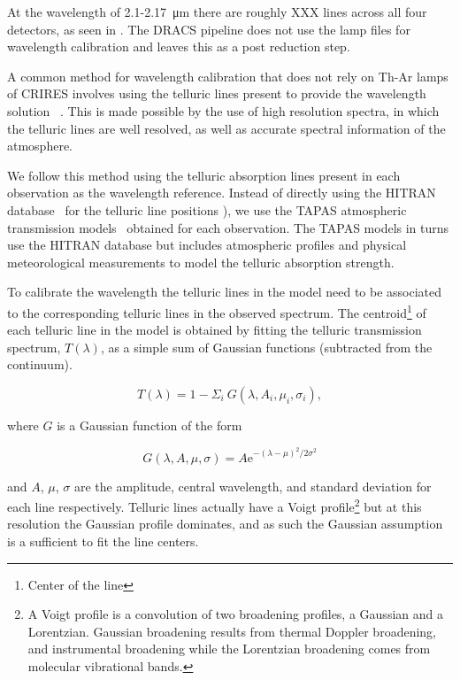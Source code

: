 At the wavelength of 2.1-2.17~\si{\micro\meter} there are roughly XXX {\thar} lines across all four detectors, as seen in .
The DRACS pipeline does not use the {\thar} lamp files for wavelength calibration and leaves this as a post reduction step.

A common method for wavelength calibration that does not rely on Th-Ar lamps of CRIRES involves using the telluric lines present to provide the wavelength solution ~\citep[e.g.][]{brogi_signature_2012,brogi_carbon_2014,dekok_detection_2013}{\red \citep{ piskorz_evidence_2016}}. This is made possible by the use of high resolution spectra, in which the telluric lines are well resolved, as well as accurate spectral information of the atmosphere. 

We follow this method using the telluric absorption lines present in each observation as the wavelength reference. Instead of directly using the HITRAN database~\citep{rothman_hitran2012_2013} for the telluric line positions \citet[such as in ][]{brogi_signature_2012,brogi_carbon_2014,dekok_detection_2013}), we use the TAPAS atmospheric transmission models~\citep{bertaux_tapas_2014} obtained for each observation. The TAPAS models in turns use the HITRAN database but includes atmospheric profiles and physical meteorological measurements to model the telluric absorption strength.

To calibrate the wavelength the telluric lines in the model need to be associated to the corresponding telluric lines in the observed spectrum. The centroid\footnote{Center of the line} of each telluric line in the model is obtained by fitting the telluric transmission spectrum, \(T(\lambda) \), as a simple sum of Gaussian functions (subtracted from the continuum).

\begin{equation}
T(\lambda) = 1 - {\Sigma}_{i}\ G(\lambda, A_{i}, {\mu}_{i}, {\sigma}_{i}),
\end{equation}

where \(G \) is a Gaussian function of the form

\begin{equation}
G(\lambda, A, \mu, \sigma) = {A \textrm{e}}^{{-(\lambda-\mu)}^{2}/2\sigma^{2}}
\end{equation}

and \(A \), \(\mu \), \(\sigma \) are the amplitude, central wavelength, and standard deviation for each line respectively. Telluric lines actually have a Voigt profile\footnote{A Voigt profile is a convolution of two broadening profiles, a Gaussian and a Lorentzian. Gaussian broadening results from thermal Doppler broadening, and instrumental broadening while the Lorentzian broadening comes from molecular vibrational bands\citep{meier_art_2005}.} but at this resolution the Gaussian profile dominates, and as such the Gaussian assumption is a sufficient to fit the line centers.

